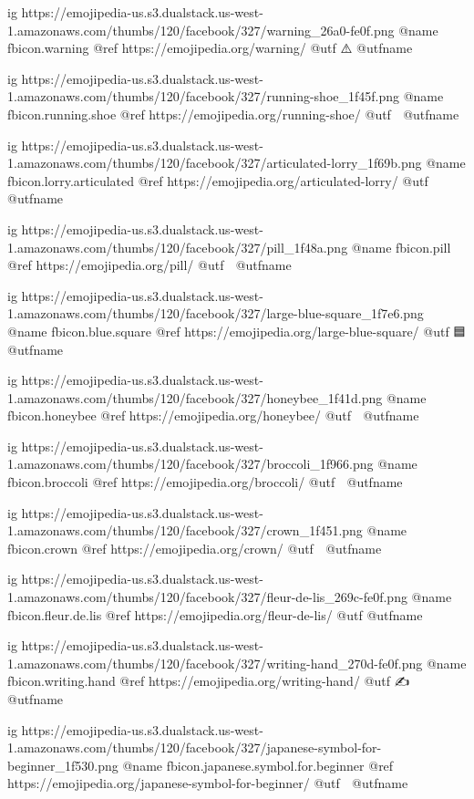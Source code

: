 	ig https://emojipedia-us.s3.dualstack.us-west-1.amazonaws.com/thumbs/120/facebook/327/warning_26a0-fe0f.png
	@name fbicon.warning
	@ref https://emojipedia.org/warning/
	@utf ⚠️
	@utfname

	ig https://emojipedia-us.s3.dualstack.us-west-1.amazonaws.com/thumbs/120/facebook/327/running-shoe_1f45f.png
	@name fbicon.running.shoe
	@ref https://emojipedia.org/running-shoe/
	@utf 👟
	@utfname

	ig https://emojipedia-us.s3.dualstack.us-west-1.amazonaws.com/thumbs/120/facebook/327/articulated-lorry_1f69b.png
	@name fbicon.lorry.articulated
	@ref https://emojipedia.org/articulated-lorry/
	@utf 🚛
	@utfname

	ig https://emojipedia-us.s3.dualstack.us-west-1.amazonaws.com/thumbs/120/facebook/327/pill_1f48a.png
	@name fbicon.pill
	@ref https://emojipedia.org/pill/
	@utf 💊
	@utfname

	ig https://emojipedia-us.s3.dualstack.us-west-1.amazonaws.com/thumbs/120/facebook/327/large-blue-square_1f7e6.png
	@name fbicon.blue.square
	@ref https://emojipedia.org/large-blue-square/
	@utf 🟦
	@utfname

	ig https://emojipedia-us.s3.dualstack.us-west-1.amazonaws.com/thumbs/120/facebook/327/honeybee_1f41d.png
	@name fbicon.honeybee
	@ref https://emojipedia.org/honeybee/
	@utf 🐝
	@utfname

	ig https://emojipedia-us.s3.dualstack.us-west-1.amazonaws.com/thumbs/120/facebook/327/broccoli_1f966.png
	@name fbicon.broccoli
	@ref https://emojipedia.org/broccoli/
	@utf 🥦
	@utfname

	ig https://emojipedia-us.s3.dualstack.us-west-1.amazonaws.com/thumbs/120/facebook/327/crown_1f451.png
	@name fbicon.crown
	@ref https://emojipedia.org/crown/
	@utf 👑
	@utfname

	ig https://emojipedia-us.s3.dualstack.us-west-1.amazonaws.com/thumbs/120/facebook/327/fleur-de-lis_269c-fe0f.png
	@name fbicon.fleur.de.lis
	@ref https://emojipedia.org/fleur-de-lis/
	@utf
	@utfname

	ig https://emojipedia-us.s3.dualstack.us-west-1.amazonaws.com/thumbs/120/facebook/327/writing-hand_270d-fe0f.png
	@name fbicon.writing.hand
	@ref https://emojipedia.org/writing-hand/
	@utf ✍️
	@utfname

	ig https://emojipedia-us.s3.dualstack.us-west-1.amazonaws.com/thumbs/120/facebook/327/japanese-symbol-for-beginner_1f530.png
	@name fbicon.japanese.symbol.for.beginner
	@ref https://emojipedia.org/japanese-symbol-for-beginner/
	@utf 🔰
	@utfname


